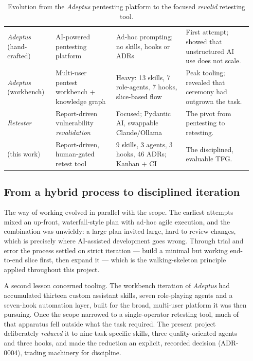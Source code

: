 \begin{table}[htbp]
\caption[Evolution of the project across earlier attempts]{Evolution from the
\emph{Adeptus} pentesting platform to the focused \emph{revalid} retesting tool.}
\label{tab:evolution}
\footnotesize
\renewcommand{\arraystretch}{1.3}
\begin{center}
\begin{tabular}{|L{2.6cm}|L{3.4cm}|L{3.0cm}|L{4.0cm}|}
\hline
{}
 &  &  &  \\ \hline
\emph{Adeptus} (hand-crafted) & AI-powered pentesting platform & Ad-hoc prompting; no skills, hooks or ADRs & First attempt; showed that unstructured AI use does not scale. \\ \hline
\emph{Adeptus} (workbench) & Multi-user pentest workbench + knowledge graph & Heavy: 13 skills, 7 role-agents, 7 hooks, slice-based flow & Peak tooling; revealed that ceremony had outgrown the task. \\ \hline
\emph{Retester} & Report-driven vulnerability \emph{revalidation} & Focused; Pydantic AI, swappable Claude/Ollama & The pivot from pentesting to retesting. \\ \hline
{} (this work) & Report-driven, human-gated retest tool & 9 skills, 3 agents, 3 hooks, 46 ADRs; Kanban + CI & The disciplined, evaluable TFG. \\ \hline
\end{tabular}
\end{center}
\end{table}

\subsection{From a hybrid process to disciplined iteration}
\label{subsec:process-evolution}

The way of working evolved in parallel with the scope. The earliest attempts mixed
an up-front, waterfall-style plan with ad-hoc agile execution, and the combination
was unwieldy: a large plan invited large, hard-to-review changes, which is precisely
where AI-assisted development goes wrong. Through trial and error the process
settled on strict iteration --- build a minimal but working end-to-end slice first,
then expand it --- which is the walking-skeleton principle applied throughout this
project.

A second lesson concerned tooling. The workbench iteration of \emph{Adeptus} had
accumulated thirteen custom assistant skills, seven role-playing agents and a
seven-hook automation layer, built for the broad, multi-user platform it was then
pursuing. Once the scope narrowed to a single-operator retesting tool, much of that
apparatus fell outside what the task required. The present project deliberately
\emph{reduced} it to nine task-specific skills, three quality-oriented agents and three
hooks, and made the reduction an explicit, recorded decision (ADR-0004), trading
machinery for discipline.

